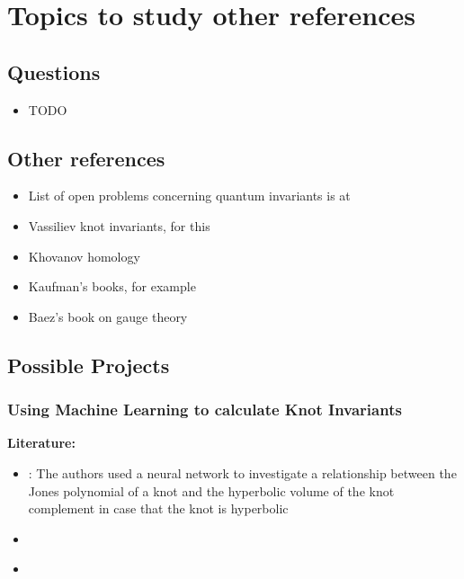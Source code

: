 \chapter{Topics to study other references}

\section{Questions}

\begin{itemize}
	\item TODO
\end{itemize}

\section{Other references}

\begin{itemize}
	\item List of open problems concerning quantum invariants
		is at
		\citep{ohtsuki2002problems}
		
	\item Vassiliev knot invariants, for this
		\citep{bar1995vassiliev}
		
	\item Khovanov homology
		\citep{bar2005khovanov}
	
	\item Kaufman's books, for example
		\citep{kauffman2001knots}
		
	\item Baez's book on gauge theory
		\citep{baez1994gauge}
\end{itemize}


\newpage
\section{Possible Projects}

\subsection{Using Machine Learning to calculate Knot Invariants}

\textbf{Literature:}
\begin{itemize}
	\item \citep{1902.05547}: The authors used a neural network
	to investigate a relationship between the Jones polynomial of a knot
	and the hyperbolic volume of the knot complement in case that the knot is
	hyperbolic
	
	\item \citep{hughes2016neural}
	
	\item \citep{bull2018machine}
\end{itemize}

